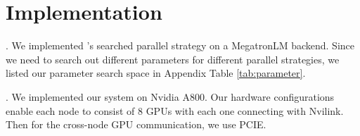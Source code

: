 \section{Implementation}

.
We implemented \sysname's searched parallel strategy on a MegatronLM backend.
Since we need to search out different parameters for different parallel strategies, we listed our parameter search space in Appendix Table \ref{tab:parameter}.

.
We implemented our system on Nvidia A800. Our hardware configurations enable each node to consist of 8 GPUs with each one connecting with Nvilink. Then for the cross-node GPU communication, we use PCIE.